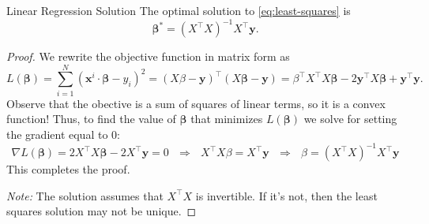 \begin{theorem}{Linear Regression Solution}{}
The optimal solution to \eqref{eq:least-squares} is 
\begin{equation}
\mathbf{\beta}^* = (X^\top X)^{-1} X^\top \mathbf{y}.
\end{equation}
\end{theorem}
\begin{proof}
We rewrite the objective function in matrix form as
\[
L(\mathbf{\beta}) = \sum_{i=1}^N (\mathbf{x}^i \cdot \mathbf{\beta} - y_i)^2 = (X\beta - \mathbf{y})^\top (X\mathbf{\beta} - \mathbf{y})
= \beta^\top X^\top X \mathbf{\beta} - 2\mathbf{y}^\top X \mathbf{\beta} + \mathbf{y}^\top \mathbf{y}.
\]
Observe that the obective is a sum of squares of linear terms, so it is a convex function!  Thus, to find the value of \(\mathbf{\beta}\) that minimizes \(L(\mathbf{\beta})\) we solve for setting the gradient equal to 0:
\[
\nabla L(\mathbf{\beta}) = 2X^\top X \mathbf{\beta} - 2X^\top \mathbf{y} = 0  \ \ \ \Rightarrow \ \ \ 
X^\top X \beta = X^\top \mathbf{y}
\ \ \ \Rightarrow \ \ \
\beta = (X^\top X)^{-1} X^\top \mathbf{y}
\]
This completes the proof.

\textit{Note:} The solution assumes that \(X^\top X\) is invertible. If it's not, then the least squares solution may not be unique.
\end{proof}



